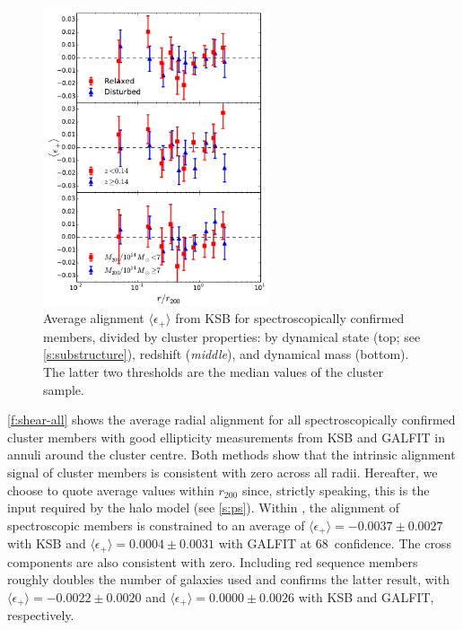 \begin{figure}
\begin{minipage}[b]{2.6in}
 \centerline{\includegraphics[width=2.6in]{chapter4/shear-spec-clsub_Mass-2-rnorm-logbins.pdf}}
\end{minipage}
\begin{minipage}[b]{2.2in}
\caption{\small Average alignment $\langle \epsilon_+ \rangle$ from KSB for spectroscopically 
confirmed members, divided by cluster properties: by dynamical state (top; see 
\cref{s:substructure}), redshift (\textit{middle}), and dynamical mass (bottom). The 
latter two thresholds are the median values of the cluster sample.}
\label{f:shear-clsub}
\end{minipage}
\end{figure}

\cref{f:shear-all} shows the average radial alignment for all spectroscopically confirmed cluster 
members with good ellipticity measurements from KSB and GALFIT in annuli around the cluster centre. 
Both methods show that the intrinsic alignment signal of cluster members is consistent with zero 
across all radii. Hereafter, we choose to quote average values within $r_{200}$ since, strictly 
speaking, this is the input required by the halo model (see \cref{s:ps}). Within \radius, the 
alignment of spectroscopic members is constrained to an average of 
$\langle\epsilon_+\rangle=-0.0037\pm0.0027$ with KSB and $\langle\epsilon_+\rangle=0.0004\pm0.0031$ 
with GALFIT at 68\percent\ confidence. The cross components are also consistent with zero. Including red 
sequence members roughly doubles the number of galaxies used and confirms the latter result, with 
$\langle\epsilon_+\rangle=-0.0022\pm0.0020$ and $\langle\epsilon_+\rangle=0.0000\pm0.0026$ with 
KSB and GALFIT, respectively.


